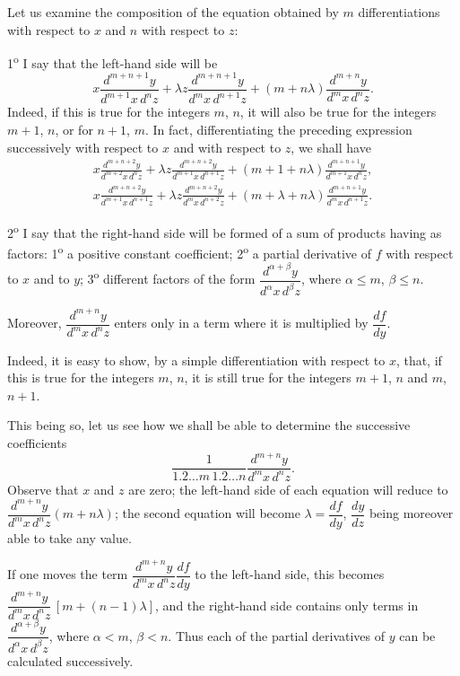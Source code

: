 \documentclass[11pt]{article}
\begin{document}
Let us examine the composition of the equation obtained by $m$ differentiations with respect to $x$ and $n$ with respect to $z$:

1\textsuperscript{o} I say that the left-hand side will be
\[
x\frac{d^{m+n+1}y}{d^{m+1}x\,d^nz}+\lambda z\frac{d^{m+n+1}y}{d^m x\,d^{n+1}z}+(m+n\lambda)\frac{d^{m+n}y}{d^m x\,d^nz}.
\]
Indeed, if this is true for the integers $m$, $n$, it will also be true for the integers $m+1$, $n$, or for $n+1$, $m$. In fact, differentiating the preceding expression successively with respect to $x$ and with respect to $z$, we shall have
\begin{align*}
x\frac{d^{m+n+2}y}{d^{m+2}x\,d^nz}+\lambda z\frac{d^{m+n+2}y}{d^{m+1}x\,d^{n+1}z}+(m+1+n\lambda)\frac{d^{m+n+1}y}{d^{m+1}x\,d^nz},\\
x\frac{d^{m+n+2}y}{d^{m+1}x\,d^{n+1}z}+\lambda z\frac{d^{m+n+2}y}{d^m x\,d^{n+2}z}+(m+\lambda+n\lambda)\frac{d^{m+n+1}y}{d^m x\,d^{n+1}z}.
\end{align*}

2\textsuperscript{o} I say that the right-hand side will be formed of a sum of products having as factors: 1\textsuperscript{o} a positive constant coefficient; 2\textsuperscript{o} a partial derivative of $f$ with respect to $x$ and to $y$; 3\textsuperscript{o} different factors of the form $\dfrac{d^{\alpha+\beta}y}{d^\alpha x\,d^\beta z}$, where $\alpha\le m$, $\beta\le n$.

Moreover, $\dfrac{d^{m+n}y}{d^m x\,d^n z}$ enters only in a term where it is multiplied by $\dfrac{df}{dy}$.

Indeed, it is easy to show, by a simple differentiation with respect to $x$, that, if this is true for the integers $m$, $n$, it is still true for the integers $m+1$, $n$ and $m$, $n+1$.

This being so, let us see how we shall be able to determine the successive coefficients
\[
\frac{1}{1.2\ldots m\,1.2\ldots n}\frac{d^{m+n}y}{d^m x\,d^nz}.
\]
Observe that $x$ and $z$ are zero; the left-hand side of each equation will reduce to $\dfrac{d^{m+n}y}{d^m x\,d^nz}(m+n\lambda)$; the second equation will become $\lambda=\dfrac{df}{dy}$, $\dfrac{dy}{dz}$ being moreover able to take any value.

If one moves the term $\dfrac{d^{m+n}y}{d^m x\,d^n z}\dfrac{df}{dy}$ to the left-hand side, this becomes $\dfrac{d^{m+n}y}{d^m x\,d^n z}\,[m+(n-1)\lambda]$, and the right-hand side contains only terms in $\dfrac{d^{\alpha+\beta}y}{d^\alpha x\,d^\beta z}$, where $\alpha<m$, $\beta<n$. Thus each of the partial derivatives of $y$ can be calculated successively.
\end{document}
